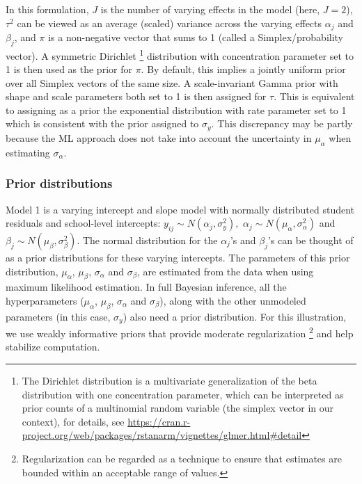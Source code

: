 In this formulation, $J$ is the number of varying effects in the model (here, $J=2$), $\tau^2$ can be viewed as an average (scaled) variance across the varying effects $\alpha_j$ and $\beta_j$, and $\pi$ is a non-negative vector that sums to 1 (called a Simplex/probability vector).  A symmetric Dirichlet \footnote{The Dirichlet distribution is a multivariate generalization of the beta distribution with one concentration parameter, which can be interpreted as prior counts of a multinomial random variable (the simplex vector in our context), for details, see \url{https://cran.r-project.org/web/packages/rstanarm/vignettes/glmer.html\#detail}} distribution with concentration parameter set to 1 is then used as the prior for $\pi$.  By default, this implies a jointly uniform prior over all Simplex vectors of the same size.  A scale-invariant Gamma prior with shape and scale parameters both set to 1 is then assigned for $\tau$.  This is equivalent to assigning as a prior the exponential distribution with rate parameter set to 1 which is consistent with the prior assigned to $\sigma_y$.
This discrepancy may be partly because the ML approach does not take into account the uncertainty in $\mu_{\alpha}$ when estimating $\sigma_{\alpha}$.

\subsubsection*{Prior distributions}
Model 1 is a varying intercept and slope model with normally distributed student residuals and school-level intercepts: $y_{ij} \sim N(\alpha_{j}, \sigma_{y}^{2}),$ $\alpha_{j}\sim N(\mu_{\alpha}, \sigma_{\alpha}^{2})$ and $\beta_{j}\sim N(\mu_{\beta}, \sigma_{\beta}^{2})$. The normal distribution for the $\alpha_{j}$'s and $\beta_{j}$'s can be thought of as a prior distributions for these varying intercepts. The parameters of this prior distribution, $\mu_{\alpha}$, $\mu_{\beta}$, $\sigma_{\alpha}$ and $\sigma_{\beta}$, are estimated from the data when using maximum likelihood estimation. In full Bayesian inference, all the hyperparameters ($\mu_{\alpha}$, $\mu_{\beta}$, $\sigma_{\alpha}$ and $\sigma_{\beta}$), along with the other unmodeled parameters (in this case, $\sigma_{y}$) also need a prior distribution. For this illustration, we use weakly informative priors that provide moderate regularization \footnote{Regularization can be regarded as a technique to ensure that estimates are bounded within an acceptable range of values.} and help stabilize computation.

